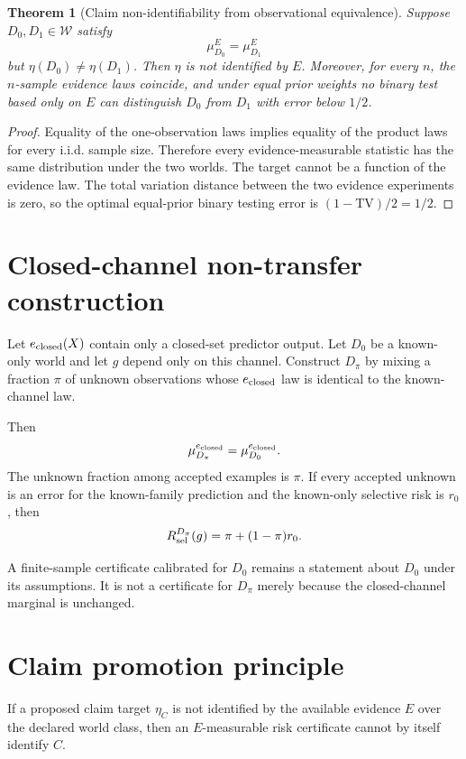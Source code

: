 \documentclass[11pt]{article}
\newtheorem{theorem}{Theorem}
\begin{document}
\begin{theorem}[Claim non-identifiability from observational equivalence]
Suppose $D_0,D_1\in\mathcal W$ satisfy
\[
\mu_{D_0}^E=\mu_{D_1}^E
\]
but $\eta(D_0)\neq\eta(D_1)$. Then $\eta$ is not identified by $E$.
Moreover, for every $n$, the $n$-sample evidence laws coincide, and under
equal prior weights no binary test based only on $E$ can distinguish
$D_0$ from $D_1$ with error below $1/2$.
\end{theorem}

\begin{proof}
Equality of the one-observation laws implies equality of the product laws for
every i.i.d. sample size. Therefore every evidence-measurable statistic has the
same distribution under the two worlds. The target cannot be a function of
the evidence law. The total variation distance between the two evidence
experiments is zero, so the optimal equal-prior binary testing error is
$(1-\mathrm{TV})/2=1/2$.
\end{proof}

\section{Closed-channel non-transfer construction}

Let $e_{\rm closed}(X)$ contain only a closed-set predictor output. Let
$D_0$ be a known-only world and let $g$ depend only on this channel. Construct
$D_\pi$ by mixing a fraction $\pi$ of unknown observations whose
$e_{\rm closed}$ law is identical to the known-channel law.

Then
\[
\mu_{D_\pi}^{e_{\rm closed}}
=
\mu_{D_0}^{e_{\rm closed}}.
\]
The unknown fraction among accepted examples is $\pi$. If every accepted
unknown is an error for the known-family prediction and the known-only
selective risk is $r_0$, then
\[
R_{\rm sel}^{D_\pi}(g)
=
\pi+(1-\pi)r_0.
\]

A finite-sample certificate calibrated for $D_0$ remains a statement about
$D_0$ under its assumptions. It is not a certificate for $D_\pi$ merely
because the closed-channel marginal is unchanged.

\section{Claim promotion principle}

If a proposed claim target $\eta_C$ is not identified by the available
evidence $E$ over the declared world class, then an $E$-measurable risk
certificate cannot by itself identify $C$.
\end{document}
